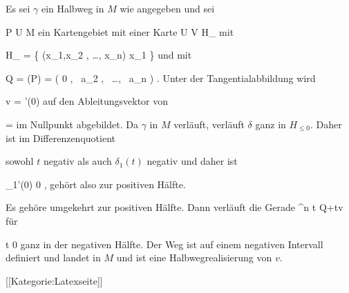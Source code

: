 Es sei $\gamma$ ein Halbweg in $M$ wie angegeben und sei

\mavergleichskette
{\vergleichskette
{ P
}
{ \in }{  U
}
{ \subseteq }{ M
}
{    }{
}
{   }{
}
}
{}{}{}
ein Kartengebiet mit einer Karte
\maabbdisp {\alpha} { U } {V \subseteq  H_{}
} {}
mit

\mavergleichskettedisp
{\vergleichskette
{  H_{}
}
{ =} { \left\{ (x_1,x_2 , \ldots, x_n)  \mid   x_1         \right\}
}
{ } {
}
{ } {
}
{ } {
}
}
{}{}{}
und mit

\mavergleichskettedisp
{\vergleichskette
{ Q
}
{ =} { \alpha(P)
}
{ =} { \left(  0   , \,  a_2  , \,   \ldots , \,  a_n                \right)
}
{ } {
}
{ } {
}
}
{}{}{.}
Unter der Tangentialabbildung wird

\mavergleichskette
{\vergleichskette
{ v
}
{ = }{ \gamma'(0)
}
{  }{
}
{    }{
}
{   }{
}
}
{}{}{}
auf den Ableitungsvektor von

\mavergleichskette
{\vergleichskette
{ \delta
}
{ = }{ \alpha \circ \gamma
}
{  }{
}
{    }{
}
{   }{
}
}
{}{}{}
im Nullpunkt abgebildet. Da $\gamma$ in $M$ verläuft, verläuft $\delta$ ganz in $H_{\leq 0}$. Daher ist im Differenzenquotient

 {  }

sowohl $t$ negativ als auch $\delta_1(t)$ negativ und daher ist

\mavergleichskettedisp
{\vergleichskette
{  \delta_1'(0)
}
{ \geq} { 0
}
{ } {
}
{ } {
}
{ } {
}
}
{}{}{,}
gehört also zur positiven Hälfte.

Es gehöre umgekehrt
 zur positiven Hälfte. Dann verläuft die Gerade
\maabbeledisp {\delta} {\R} {\R^n
} { t } { Q+tv
} {}
für

\mavergleichskette
{\vergleichskette
{ t
}
{ \leq }{  0
}
{  }{
}
{    }{
}
{   }{
}
}
{}{}{}
ganz in der negativen Hälfte. Der Weg
 ist auf einem negativen Intervall definiert und landet in $M$ und ist eine Halbwegrealisierung von $v$.

 [[Kategorie:Latexseite]]
